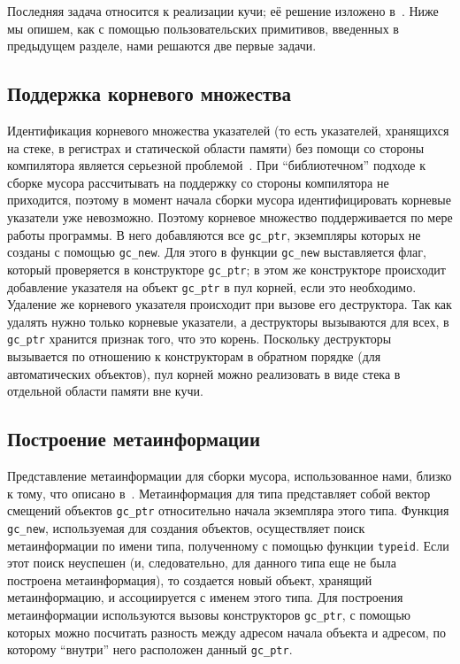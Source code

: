 Последняя задача относится к реализации кучи; её решение изложено в~\cite{realisation}. Ниже 
мы опишем, как с помощью пользовательских примитивов, введенных в предыдущем разделе,
нами решаются две первые задачи.

\subsection{Поддержка корневого множества}

Идентификация корневого множества указателей (то есть указателей, хранящихся на стеке, в регистрах и статической
области памяти) без помощи со стороны компилятора является серьезной проблемой~\cite{roots}. При ``библиотечном''
подходе к сборке мусора рассчитывать на поддержку со стороны компилятора не приходится, поэтому в момент
начала сборки мусора идентифицировать корневые указатели уже невозможно. Поэтому корневое множество
поддерживается по мере работы программы. В него добавляются все \lstinline{gc_ptr}, экземпляры которых
не созданы с помощью \lstinline{gc_new}. Для этого в функции \lstinline{gc_new} выставляется флаг,
который проверяется в конструкторе \lstinline{gc_ptr}; в этом же конструкторе происходит добавление
указателя на объект \lstinline{gc_ptr} в пул корней, если это необходимо. Удаление же корневого
указателя происходит при вызове его деструктора. Так как удалять нужно только корневые указатели, а деструкторы
вызываются для всех, в \lstinline{gc_ptr} хранится признак того, что это корень. Поскольку деструкторы 
вызывается по отношению к конструкторам в обратном порядке (для автоматических объектов), пул корней можно 
реализовать в виде стека в отдельной области памяти вне кучи. 

\subsection{Построение метаинформации}

Представление метаинформации для сборки мусора, использованное нами, близко к тому, что описано
в~\cite{meta}. Метаинформация для типа представляет собой вектор смещений объектов \lstinline{gc_ptr} 
относительно начала экземпляра этого типа. Функция \lstinline{gc_new}, используемая для создания объектов, 
осуществляет поиск метаинформации по имени типа, полученному с помощью функции \lstinline{typeid}. 
Если этот поиск неуспешен (и, следовательно, для данного типа еще не была построена метаинформация), 
то создается новый объект, хранящий метаинформацию, и ассоциируется с именем этого типа. Для построения
метаинформации используются вызовы конструкторов \lstinline{gc_ptr}, с помощью которых можно
посчитать разность между адресом начала объекта и адресом, по которому ``внутри'' него расположен данный
\lstinline{gc_ptr}. 

